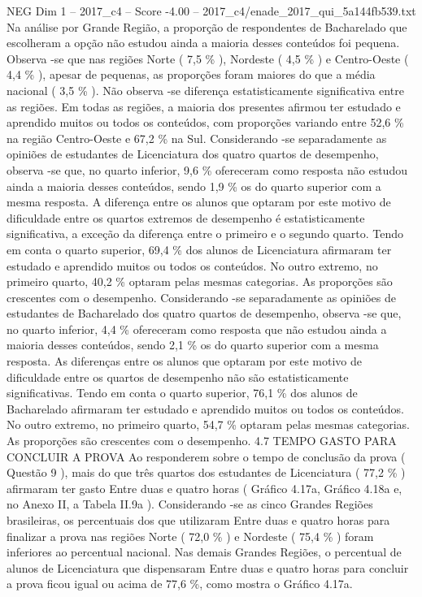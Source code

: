 \begin{textsample}{NEG Dim 1 – 2017\_c4 – Score -4.00 – 2017\_c4/enade\_2017\_qui\_5a144fb539.txt}
Na análise por Grande Região, a proporção de respondentes de Bacharelado que escolheram a opção não estudou ainda a maioria desses conteúdos foi pequena.
Observa -se que nas regiões Norte ( 7,5 \% ), Nordeste ( 4,5 \% ) e Centro-Oeste ( 4,4 \% ), apesar de pequenas, as proporções foram maiores do que a média nacional ( 3,5 \% ).
Não observa -se diferença estatisticamente significativa entre as regiões.
Em todas as regiões, a maioria dos presentes afirmou ter estudado e aprendido muitos ou todos os conteúdos, com proporções variando entre 52,6 \% na região Centro-Oeste e 67,2 \% na Sul.
Considerando -se separadamente as opiniões de estudantes de Licenciatura dos quatro quartos de desempenho, observa -se que, no quarto inferior, 9,6 \% ofereceram como resposta não estudou ainda a maioria desses conteúdos, sendo 1,9 \% os do quarto superior com a mesma resposta.
A diferença entre os alunos que optaram por este motivo de dificuldade entre os quartos extremos de desempenho é estatisticamente significativa, a exceção da diferença entre o primeiro e o segundo quarto.
Tendo em conta o quarto superior, 69,4 \% dos alunos de Licenciatura afirmaram ter estudado e aprendido muitos ou todos os conteúdos.
No outro extremo, no primeiro quarto, 40,2 \% optaram pelas mesmas categorias.
As proporções são crescentes com o desempenho.
Considerando -se separadamente as opiniões de estudantes de Bacharelado dos quatro quartos de desempenho, observa -se que, no quarto inferior, 4,4 \% ofereceram como resposta que não estudou ainda a maioria desses conteúdos, sendo 2,1 \% os do quarto superior com a mesma resposta.
As diferenças entre os alunos que optaram por este motivo de dificuldade entre os quartos de desempenho não são estatisticamente significativas.
Tendo em conta o quarto superior, 76,1 \% dos alunos de Bacharelado afirmaram ter estudado e aprendido muitos ou todos os conteúdos.
No outro extremo, no primeiro quarto, 54,7 \% optaram pelas mesmas categorias.
As proporções são crescentes com o desempenho. 4.7 TEMPO GASTO PARA CONCLUIR A PROVA Ao responderem sobre o tempo de conclusão da prova ( Questão 9 ), mais do que três quartos dos estudantes de Licenciatura ( 77,2 \% ) afirmaram ter gasto Entre duas e quatro horas ( Gráfico 4.17a, Gráfico 4.18a e, no Anexo II, a Tabela II.9a ).
Considerando -se as cinco Grandes Regiões brasileiras, os percentuais dos que utilizaram Entre duas e quatro horas para finalizar a prova nas regiões Norte ( 72,0 \% ) e Nordeste ( 75,4 \% ) foram inferiores ao percentual nacional.
Nas demais Grandes Regiões, o percentual de alunos de Licenciatura que dispensaram Entre duas e quatro horas para concluir a prova ficou igual ou acima de 77,6 \%, como mostra o Gráfico 4.17a.

\end{textsample}
